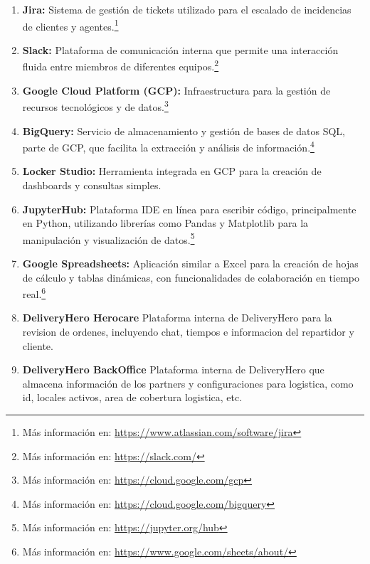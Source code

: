 \begin{enumerate}
	\item \textbf{Jira:} Sistema de gestión de tickets utilizado para el escalado de incidencias de clientes y agentes.\footnote{Más información en: \url{https://www.atlassian.com/software/jira}}
	\item \textbf{Slack:} Plataforma de comunicación interna que permite una interacción fluida entre miembros de diferentes equipos.\footnote{Más información en: \url{https://slack.com/}}
	\item \textbf{Google Cloud Platform (GCP):} Infraestructura para la gestión de recursos tecnológicos y de datos.\footnote{Más información en: \url{https://cloud.google.com/gcp}}
	\item \textbf{BigQuery:} Servicio de almacenamiento y gestión de bases de datos SQL, parte de GCP, que facilita la extracción y análisis de información.\footnote{Más información en: \url{https://cloud.google.com/bigquery}}
	\item \textbf{Locker Studio:} Herramienta integrada en GCP para la creación de dashboards y consultas simples.
	\item \textbf{JupyterHub:} Plataforma IDE en línea para escribir código, principalmente en Python, utilizando librerías como Pandas y Matplotlib para la manipulación y visualización de datos.\footnote{Más información en: \url{https://jupyter.org/hub}}
	\item \textbf{Google Spreadsheets:} Aplicación similar a Excel para la creación de hojas de cálculo y tablas dinámicas, con funcionalidades de colaboración en tiempo real.\footnote{Más información en: \url{https://www.google.com/sheets/about/}}
	\item \textbf{DeliveryHero Herocare} Plataforma interna de DeliveryHero para la revision de ordenes, incluyendo chat, tiempos e informacion del repartidor y cliente.
	\item \textbf{DeliveryHero BackOffice} Plataforma interna de DeliveryHero que almacena información de los partners y configuraciones para logistica, como id, locales activos, area de cobertura logistica, etc.
\end{enumerate}


